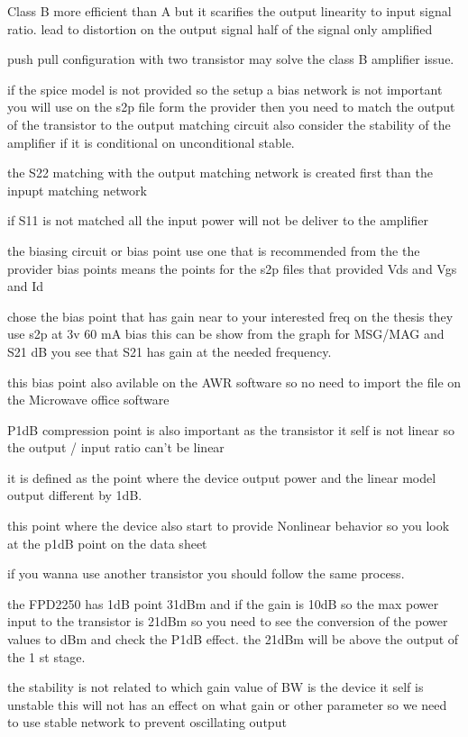 \documentclass{article}
\begin{document}
Class B more efficient than A but it scarifies the output linearity to  input signal ratio. lead to distortion on the output
signal half of the signal only amplified 

push pull configuration with two transistor may solve the class B amplifier issue.

if the spice model is not provided so the setup a bias network is not important you will use on the s2p file form the 
provider then you need to match the output of the transistor to the output matching circuit 
also consider the stability of the amplifier if it is conditional on unconditional stable.

the S22 matching with the output matching network is created first than the inpupt matching network 

if S11 is not matched all the input power will not be deliver to the amplifier 

the biasing circuit or bias point use one that is recommended from the the provider bias points means the points for the 
s2p files that provided Vds and Vgs and Id  

chose the bias point that has gain near to your interested freq on the thesis they use s2p at 3v 60 mA bias this can be show from the graph for 
MSG/MAG and S21 dB  you see that S21 has gain at the needed frequency.


this bias point also avilable on the AWR software so no need to import the file on the Microwave office software 


P1dB  compression point is also important  as the transistor it self is not linear so the output / input ratio can't be linear
 
it is defined as the point where the device output power and the linear model output different
by 1dB.

this point where the device also start to provide Nonlinear behavior so you look at the p1dB point on the data sheet 

if you wanna use another transistor you should follow the same process.

the FPD2250 has 1dB point 31dBm  and if the gain is 10dB  so the max power input to the transistor
is 21dBm so you need to see the conversion of the power values to dBm and check the P1dB effect. the 21dBm will be 
above the output of the 1 st stage.

the stability is not related to which gain value of BW is the device it self is unstable  this will not has an effect
on what gain or other parameter so we need to use stable network to prevent oscillating output
\end{document}
